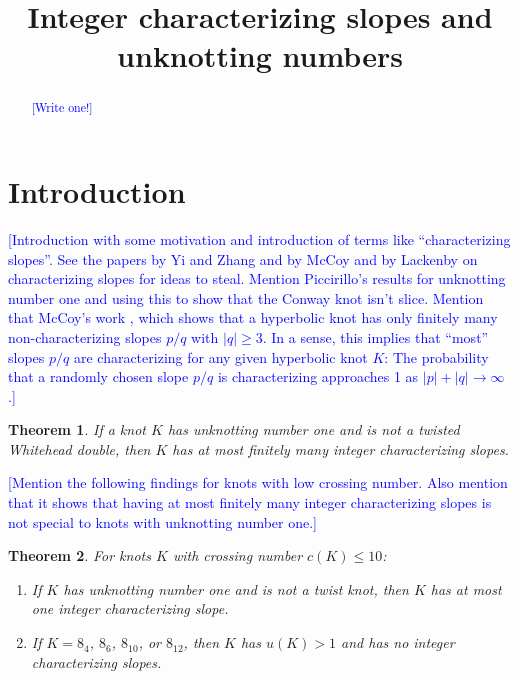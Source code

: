 \documentclass[11pt,usenames,dvipsnames,reqno]{amsart}
\newtheorem{theorem}{Theorem}
\numberwithin{theorem}{section}
\theoremstyle{ex}
\theoremstyle{rem}
\def\kh#1{\textcolor{Blue}{#1}}
\begin{document}


\title{Integer characterizing slopes and unknotting numbers}

\begin{abstract} 
\kh{[Write one!]}
\end{abstract}


\maketitle

\section{Introduction}\label{sec:intro}

\kh{[Introduction with some motivation and introduction of terms like ``characterizing slopes''. See the papers by Yi and Zhang and by McCoy and by Lackenby on characterizing slopes for ideas to steal. Mention Piccirillo's results for unknotting number one and using this to show that the Conway knot isn't slice. Mention that McCoy's work \cite{mccoy:hyperbolic}, which shows that a hyperbolic knot has only finitely many non-characterizing slopes $p/q$ with $|q| \geq 3$. In a sense, this implies that ``most'' slopes $p/q$ are characterizing for any given hyperbolic knot $K$: The  probability that a randomly chosen slope $p/q$ is characterizing approaches 1 as $|p|+|q|\to \infty$.]}



\begin{theorem}\label{thm:unknotting-one} If a knot $K$ has unknotting number one and is not a twisted Whitehead double, then $K$ has at most finitely many integer characterizing slopes.
\end{theorem}

\kh{[Mention the following findings for knots with low crossing number. Also mention that it shows that having at most finitely many integer characterizing slopes is not special to knots with unknotting number one.]}


\begin{theorem}\label{thm:low-crossing} For knots $K$ with crossing number $c(K) \leq 10$:
\begin{enumerate}[label=\normalfont \bf (\alph*)]
\item If $K$ has unknotting number one and is not a twist knot, then $K$ has at most one integer characterizing slope.
\item If $K=8_4$, $8_6$, $8_{10}$, or $8_{12}$, then $K$ has $u(K)>1$ and has no integer characterizing slopes.
\end{enumerate}
\end{theorem}
\end{document}
